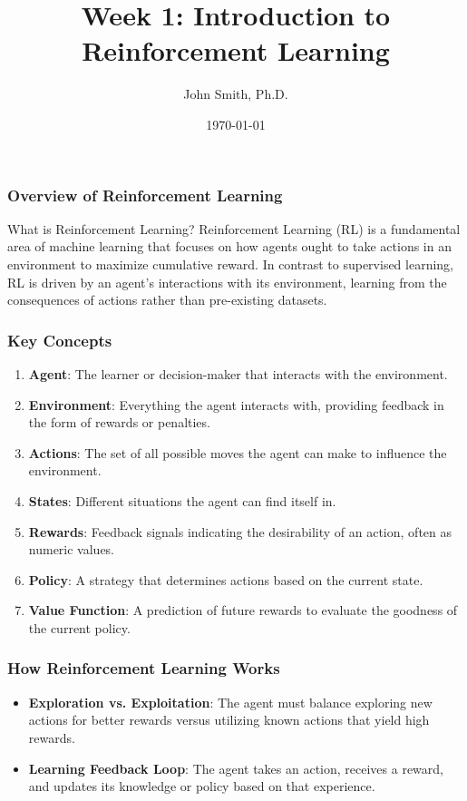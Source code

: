 \documentclass[aspectratio=169]{beamer}
\title[Reinforcement Learning]{Week 1: Introduction to Reinforcement Learning}
\author[J. Smith]{John Smith, Ph.D.}
\institute[University Name]{
  Department of Computer Science\\
  University Name\\
  \vspace{0.3cm}
  Email: email@university.edu\\
  Website: www.university.edu
}
\date{\today}
\begin{document}
\frame{\titlepage}

\begin{frame}[fragile]
    \titlepage
\end{frame}

\begin{frame}[fragile]
    \frametitle{Overview of Reinforcement Learning}
    \begin{block}{What is Reinforcement Learning?}
        Reinforcement Learning (RL) is a fundamental area of machine learning that focuses on how agents ought to take actions in an environment to maximize cumulative reward. In contrast to supervised learning, RL is driven by an agent's interactions with its environment, learning from the consequences of actions rather than pre-existing datasets.
    \end{block}
\end{frame}

\begin{frame}[fragile]
    \frametitle{Key Concepts}
    \begin{enumerate}
        \item \textbf{Agent}: The learner or decision-maker that interacts with the environment.
        \item \textbf{Environment}: Everything the agent interacts with, providing feedback in the form of rewards or penalties.
        \item \textbf{Actions}: The set of all possible moves the agent can make to influence the environment.
        \item \textbf{States}: Different situations the agent can find itself in.
        \item \textbf{Rewards}: Feedback signals indicating the desirability of an action, often as numeric values.
        \item \textbf{Policy}: A strategy that determines actions based on the current state.
        \item \textbf{Value Function}: A prediction of future rewards to evaluate the goodness of the current policy.
    \end{enumerate}
\end{frame}

\begin{frame}[fragile]
    \frametitle{How Reinforcement Learning Works}
    \begin{itemize}
        \item \textbf{Exploration vs. Exploitation}: The agent must balance exploring new actions for better rewards versus utilizing known actions that yield high rewards.
        
        \item \textbf{Learning Feedback Loop}: The agent takes an action, receives a reward, and updates its knowledge or policy based on that experience.
    \end{itemize}
\end{frame}
\end{document}
